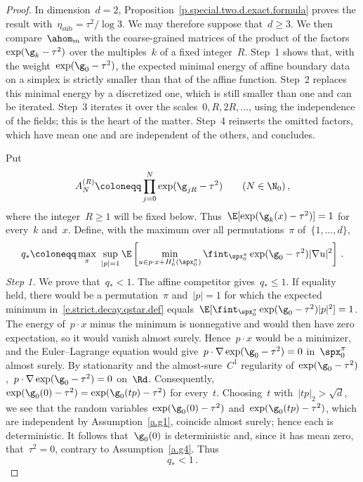\documentclass[11pt]{amsart}
\begin{document}
\begin{proof}
	In dimension~$d=2$, Proposition~\ref{p.special.two.d.exact.formula} proves the result with~$\eta_{\mathrm{sub}}=\tau^2/\log3$.  We may therefore suppose that~$d\geq3$. We then compare~$\ahom_m$ with the coarse-grained matrices of the product of the factors~$\exp(\g_k-\tau^2)$ over the multiples~$k$ of a fixed integer~$R$. Step~1 shows that, with the weight~$\exp(\g_0-\tau^2)$, the expected minimal energy of affine boundary data on a simplex is strictly smaller than that of the affine function. Step~2 replaces this minimal energy by a discretized one, which is still smaller than one and can be iterated. Step~3 iterates it over the scales~$0,R,2R,\ldots$, using the independence of the fields; this is the heart of the matter. Step~4 reinserts the omitted factors, which have mean one and are independent of the others, and concludes.

\smallskip

	Put
	\begin{equation*}
		A_N^{(R)}
		\coloneqq
		\prod_{j=0}^N \exp(\g_{jR}-\tau^2)
		\qquad(N\in\N_0)\,,
	\end{equation*}
	where the integer~$R\geq1$ will be fixed below.  Thus~$\E[\exp(\g_k(x)-\tau^2)]=1$ for every~$k$ and~$x$.  Define, with the maximum over all permutations~$\pi$ of~$\{1,\ldots,d\}$,
	\begin{equation}
		q_*
		\coloneqq
		\max_{\pi}\
		\sup_{|p|=1}
		\E\left[
		\min_{u\in p\cdot x+H_0^1(\spx_0^\pi)}
		\fint_{\spx_0^\pi}\exp(\g_0-\tau^2)|\nabla u|^2
		\right]\,.
		\label{e.strict.decay.qstar.def}
	\end{equation}
	\emph{Step 1.} We prove that~$q_*<1$. The affine competitor gives~$q_*\leq1$.  If equality held, there would be a permutation~$\pi$ and~$|p|=1$ for which the expected minimum in~\eqref{e.strict.decay.qstar.def} equals~$\E[\fint_{\spx_0^\pi}\exp(\g_0-\tau^2)|p|^2]=1$. The energy of~$p\cdot x$ minus the minimum is nonnegative and would then have zero expectation, so it would vanish almost surely.  Hence~$p\cdot x$ would be a minimizer, and the Euler--Lagrange equation would give~$p\cdot\nabla \exp(\g_0-\tau^2)=0$ in~$\spx_0^\pi$ almost surely.  By stationarity and the almost-sure~$C^1$ regularity of~$\exp(\g_0-\tau^2)$,~$p\cdot\nabla \exp(\g_0-\tau^2)=0$ on~$\Rd$.  Consequently,~$\exp(\g_0(0)-\tau^2)=\exp(\g_0(tp)-\tau^2)$ for every~$t$.  Choosing~$t$ with~$|tp|_2>\sqrt d$, we see that the random variables~$\exp(\g_0(0)-\tau^2)$ and~$\exp(\g_0(tp)-\tau^2)$, which are independent by Assumption~\ref{a.g1}, coincide almost surely; hence each is deterministic. It follows that~$\g_0(0)$ is deterministic and, since it has mean zero, that~$\tau^2=0$, contrary to Assumption~\ref{a.g4}.  Thus
	\begin{equation}
		q_*<1\,.
		\label{e.strict.decay.qstar.gap}
	\end{equation}


\end{proof}
\end{document}
